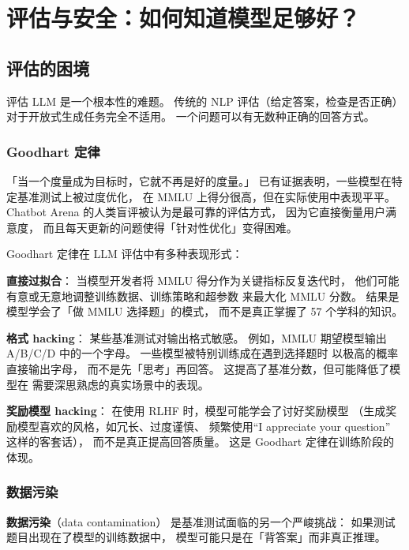\chapter{评估与安全：如何知道模型足够好？}
\label{ch:eval}

\section{评估的困境}

评估 LLM 是一个根本性的难题。
传统的 NLP 评估（给定答案，检查是否正确）
对于开放式生成任务完全不适用。
一个问题可以有无数种正确的回答方式。

\subsection{Goodhart 定律}

\begin{warnbox}
「当一个度量成为目标时，它就不再是好的度量。」
已有证据表明，一些模型在特定基准测试上被过度优化，
在 MMLU 上得分很高，但在实际使用中表现平平。
Chatbot Arena 的人类盲评被认为是最可靠的评估方式，
因为它直接衡量用户满意度，
而且每天更新的问题使得「针对性优化」变得困难。
\end{warnbox}

Goodhart 定律在 LLM 评估中有多种表现形式：

\textbf{直接过拟合}：
当模型开发者将 MMLU 得分作为关键指标反复迭代时，
他们可能有意或无意地调整训练数据、训练策略和超参数
来最大化 MMLU 分数。
结果是模型学会了「做 MMLU 选择题」的模式，
而不是真正掌握了 57 个学科的知识。

\textbf{格式 hacking}：
某些基准测试对输出格式敏感。
例如，MMLU 期望模型输出 A/B/C/D 中的一个字母。
一些模型被特别训练成在遇到选择题时
以极高的概率直接输出字母，
而不是先「思考」再回答。
这提高了基准分数，但可能降低了模型在
需要深思熟虑的真实场景中的表现。

\textbf{奖励模型 hacking}：
在使用 RLHF 时，模型可能学会了讨好奖励模型
（生成奖励模型喜欢的风格，如冗长、过度谨慎、
频繁使用“I appreciate your question” 这样的客套话），
而不是真正提高回答质量。
这是 Goodhart 定律在训练阶段的体现。

\subsection{数据污染}
\label{subsec:data-contamination}

\textbf{数据污染}（data contamination）
是基准测试面临的另一个严峻挑战：
如果测试题目出现在了模型的训练数据中，
模型可能只是在「背答案」而非真正推理。

